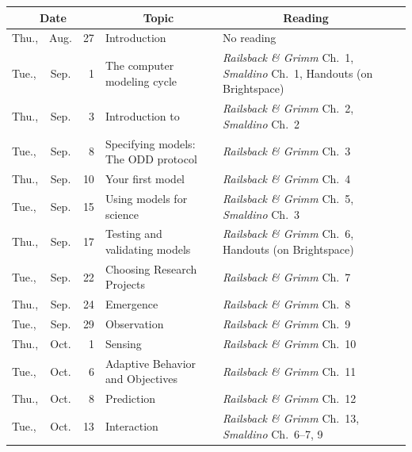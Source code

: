 \documentclass[11pt,twoside]{jgsyllabus}\usepackage[]{graphicx}\usepackage[]{xcolor}
\begin{document}
\setlength{\aboverulesep}{0.2ex}
\setlength{\belowrulesep}{0.2ex}
\setlength{\extrarowheight}{0.1ex}
\setlength{\heavyrulewidth}{0.5pt}
\setlength{\lightrulewidth}{0.05pt}
\begin{center}
\begin{tabular}{l@{~}c@{~}r>{\raggedright}m{2.6in}>{\centering}m{2in}c}
  \toprule
  \multicolumn{3}{c}{\bfseries Date} & \multicolumn{1}{c}{\bfseries Topic} &\multicolumn{1}{c}{\bfseries Reading} &\\
 \midrule
Thu., & Aug. &  27 & Introduction & No reading &  \\ 
   \midrule
Tue., & Sep. &   1 & The computer modeling cycle & \emph{Railsback \& Grimm\/} Ch.~1, \emph{Smaldino\/} Ch.~1, Handouts (on Brightspace) &  \\ 
   \midrule
Thu., & Sep. &   3 & Introduction to \NetLogo{} & \emph{Railsback \& Grimm\/} Ch.~2, \emph{Smaldino\/} Ch.~2 &  \\ 
   \midrule
Tue., & Sep. &   8 & Specifying models: The ODD protocol & \emph{Railsback \& Grimm\/} Ch.~3 &  \\ 
   \midrule
Thu., & Sep. &  10 & Your first model & \emph{Railsback \& Grimm\/} Ch.~4 &  \\ 
   \midrule
Tue., & Sep. &  15 & Using models for science & \emph{Railsback \& Grimm\/} Ch.~5, \emph{Smaldino\/} Ch.~3 &  \\ 
   \midrule
Thu., & Sep. &  17 & Testing and validating models & \emph{Railsback \& Grimm\/} Ch.~6, Handouts (on Brightspace) &  \\ 
   \midrule
Tue., & Sep. &  22 & Choosing Research Projects & \emph{Railsback \& Grimm\/} Ch.~7 &  \\ 
   \midrule
Thu., & Sep. &  24 & Emergence & \emph{Railsback \& Grimm\/} Ch.~8 &  \\ 
   \midrule
Tue., & Sep. &  29 & Observation & \emph{Railsback \& Grimm\/} Ch.~9 &  \\ 
   \midrule
Thu., & Oct. &   1 & Sensing & \emph{Railsback \& Grimm\/} Ch.~10 &  \\ 
   \midrule
Tue., & Oct. &   6 & Adaptive Behavior and Objectives & \emph{Railsback \& Grimm\/} Ch.~11 &  \\ 
   \midrule
Thu., & Oct. &   8 & Prediction & \emph{Railsback \& Grimm\/} Ch.~12 &  \\ 
   \midrule
Tue., & Oct. &  13 & Interaction & \emph{Railsback \& Grimm\/} Ch.~13, \emph{Smaldino\/} Ch.~6--7, 9 &  \\ 

\end{tabular}
\end{center}
\end{document}
